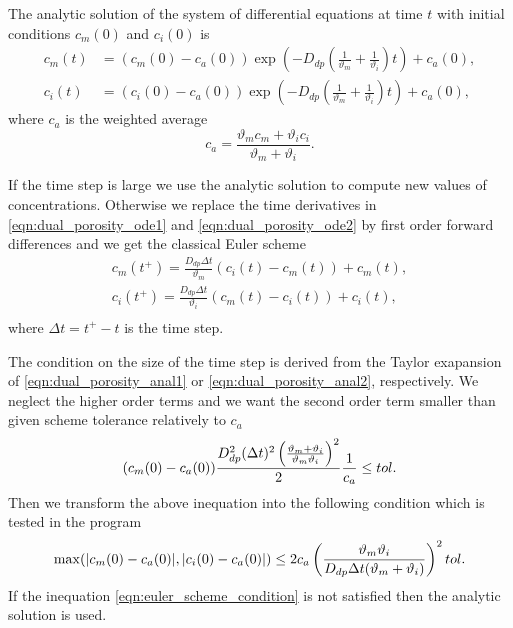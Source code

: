 The analytic solution of the system of differential equations at time $t$ with initial conditions $c_m(0)$ and $c_i(0)$ is
\begin{align}
     c_m(t) &= (c_m(0) - c_a(0)) \exp\left(- D_{dp}\left(\frac{1}{\vartheta_m} + \frac{1}{\vartheta_i}\right) t \right) + c_a(0), 
     \label{eqn:dual_porosity_anal1}\\
     c_i(t) &= (c_i(0) - c_a(0)) \exp\left(- D_{dp}\left(\frac{1}{\vartheta_m} + \frac{1}{\vartheta_i}\right) t \right) + c_a(0),
     \label{eqn:dual_porosity_anal2}
\end{align}
where $c_a$ is the weighted average
\[
  c_a = \frac{\vartheta_m c_m + \vartheta_i c_i}{\vartheta_m + \vartheta_i}.
\]

If the time step is large we use the analytic solution to compute new values of concentrations. 
Otherwise we replace the time derivatives in \eqref{eqn:dual_porosity_ode1} and \eqref{eqn:dual_porosity_ode2} 
by first order forward differences and we get the classical Euler scheme
\begin{align}
  c_m(t^+) = \frac{D_{dp} \Delta t}{\vartheta_m}(c_i(t) - c_m(t)) + c_m(t), \\
  c_i(t^+) = \frac{D_{dp} \Delta t}{\vartheta_i}(c_m(t) - c_i(t)) + c_i(t), \\
\end{align}
where $\Delta t = t^+ - t$ is the time step. 

The condition on the size of the time step is derived from the Taylor exapansion of 
\eqref{eqn:dual_porosity_anal1} or \eqref{eqn:dual_porosity_anal2}, respectively. We neglect the higher order 
terms and we want the second order term smaller than given scheme tolerance 
 relatively to $c_a$
\begin{equation}
  (c_m(0) - c_a(0))
  \frac{ D_{dp}^2 (\Delta t)^2 \left(\frac{\vartheta_m + \vartheta_i}{\vartheta_m \vartheta_i}\right)^2}{2}
  \frac{1}{c_a} \leq tol. \\
\end{equation}
Then we transform the above inequation into the following condition which is tested in the program
\begin{equation} \label{eqn:euler_scheme_condition}
  \max(|c_m(0) - c_a(0)|, |c_i(0) - c_a(0)|) \leq 
  2 c_a \left(\frac{\vartheta_m \vartheta_i}{D_{dp} \Delta t (\vartheta_m + \vartheta_i)}\right)^2 tol. \\
\end{equation}
If the inequation \eqref{eqn:euler_scheme_condition} is not satisfied then the analytic 
solution is used.
 

